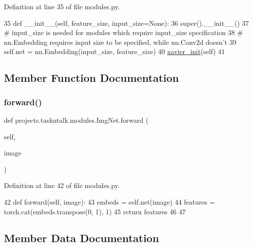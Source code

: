 Definition at line 35 of file modules.\+py.


\begin{DoxyCode}
35     \textcolor{keyword}{def }\_\_init\_\_(self, feature\_size, input\_size=None):
36         super().\_\_init\_\_()
37         \textcolor{comment}{# input\_size is needed for modules which require input\_size specification}
38         \textcolor{comment}{# nn.Embedding requires input size to be specified, while nn.Conv2d doesn't}
39         self.net = nn.Embedding(input\_size, feature\_size)
40         \hyperlink{namespaceprojects_1_1taskntalk_1_1modules_a483197f0d561a3d1ef7d04a2de70e571}{xavier\_init}(self)
41 
\end{DoxyCode}


\subsection{Member Function Documentation}
\mbox{\label{classprojects_1_1taskntalk_1_1modules_1_1ImgNet_a6bdd1b350561c7fc3dce2be95b92fdb7}} 
\subsubsection{\texorpdfstring{forward()}{forward()}}
{\footnotesize\ttfamily def projects.\+taskntalk.\+modules.\+Img\+Net.\+forward (\begin{DoxyParamCaption}\item[{}]{self,  }\item[{}]{image }\end{DoxyParamCaption})}



Definition at line 42 of file modules.\+py.


\begin{DoxyCode}
42     \textcolor{keyword}{def }forward(self, image):
43         embeds = self.net(image)
44         features = torch.cat(embeds.transpose(0, 1), 1)
45         \textcolor{keywordflow}{return} features
46 
47 
\end{DoxyCode}


\subsection{Member Data Documentation}
\mbox{\label{classprojects_1_1taskntalk_1_1modules_1_1ImgNet_ad2f75d9e18e4b10703db9f2ff3a988d2}} 
